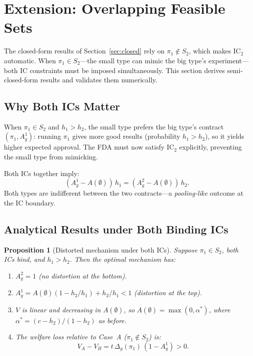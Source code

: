 \documentclass[12pt,a4paper]{article}
\newtheorem{proposition}{Proposition}
\begin{document}
\section{Extension: Overlapping Feasible Sets}
\label{sec:overlap}

The closed-form results of Section~\ref{sec:closed} rely on
$\pi_1 \notin S_2$, which makes $\mathrm{IC}_2$ automatic.
When $\pi_1 \in S_2$---the small type can mimic the big
type's experiment---both IC constraints must be imposed
simultaneously. This section derives semi-closed-form results
and validates them numerically.

\subsection{Why Both ICs Matter}

When $\pi_1 \in S_2$ and $h_1 > h_2$, the small type
prefers the big type's contract
$(\pi_1, A_g^1)$: running $\pi_1$ gives more good results
(probability $h_1 > h_2$), so it yields higher expected
approval. The FDA must now satisfy $\mathrm{IC}_2$
explicitly, preventing the small type from mimicking.

Both ICs together imply:
\begin{equation}\label{eq:both_IC}
  (A_g^1 - A(\emptyset)) \, h_1
  = (A_g^2 - A(\emptyset)) \, h_2.
\end{equation}
Both types are indifferent between the two contracts---a
\emph{pooling-like} outcome at the IC boundary.


\subsection{Analytical Results under Both Binding ICs}

\begin{proposition}[Distorted mechanism under both ICs]
\label{prop:both_IC}
Suppose $\pi_1 \in S_2$, both ICs bind, and $h_1 > h_2$.
Then the optimal mechanism has:
\begin{enumerate}
  \item[(i)] $A_g^2 = 1$ (no distortion at the bottom).
  \item[(ii)] $A_g^1 = A(\emptyset)(1 - h_2/h_1) + h_2/h_1
    < 1$ (distortion at the top).
  \item[(iii)] $V$ is linear and decreasing in
    $A(\emptyset)$, so $A(\emptyset) = \max(0, \alpha^*)$,
    where $\alpha^* = (c - h_2)/(1 - h_2)$ as before.
  \item[(iv)] The welfare loss relative to Case~A
    ($\pi_1 \notin S_2$) is:
    \begin{equation}\label{eq:IC_welfare_loss}
      V_A - V_B = t \, \Delta_g(\pi_1) \,
        (1 - A_g^1) > 0.
    \end{equation}
\end{enumerate}
\end{proposition}
\end{document}
